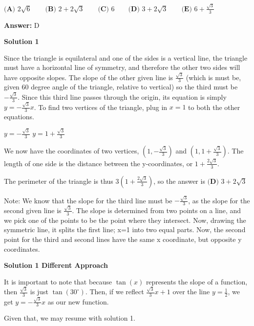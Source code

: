 \begin{enumerate}
 $\textbf{(A) }2\sqrt{6}\qquad\textbf{(B) }2+2\sqrt{3}\qquad\textbf{(C) }6\qquad\textbf{(D) }3+2\sqrt{3}\qquad\textbf{(E) }6+\frac{\sqrt{3}}{3}$

 \textbf{Answer: }D



\textbf{Solution 1}

Since the triangle is equilateral and one of the sides is a vertical line, the triangle must have a horizontal line of symmetry, and therefore the other two sides will have opposite slopes. The slope of the other given line is $\frac{\sqrt{3}}{3}$ (which is must be, given 60 degree angle of the triangle, relative to vertical) so the third must be $-\frac{\sqrt{3}}{3}$. Since this third line passes through the origin, its equation is simply $y = -\frac{\sqrt{3}}{3}x$. To find two vertices of the triangle, plug in $x=1$ to both the other equations. 

 $y = -\frac{\sqrt{3}}{3}$
$y = 1 + \frac{\sqrt{3}}{3}$

 We now have the coordinates of two vertices, $\left(1, -\frac{\sqrt{3}}{3}\right)$ and $\left(1, 1 + \frac{\sqrt{3}}{3}\right)$. The length of one side is the distance between the y-coordinates, or $1 +  \frac{2\sqrt{3}}{3}$.

 The perimeter of the triangle is thus $3\left(1 +  \frac{2\sqrt{3}}{3}\right)$, so the answer is $\boxed{\textbf{(D) }3 + 2\sqrt{3}}$

 Note: We know that the slope for the third line must be $-\frac{\sqrt{3}}{3}$, as the slope for the second given line is $\frac{\sqrt{3}}{3}$. The slope is determined from two points on a line, and we pick one of the points to be the point where they intersect. Now, drawing the symmetric line, it splits the first line; x=1 into two equal parts. Now, the second point for the third and second lines have the same x coordinate, but opposite y coordinates.

 



\textbf{Solution 1 Different Approach}

It is important to note that because \( \tan(x) \) represents the slope of a function, then \( \frac{\sqrt{3}}{3} \) is just \( \tan(30^\circ) \). Then, if we reflect \( \frac{\sqrt{3}}{3} x+1 \) over the line \( y=\frac{1}{2} \), we get \( y=-\frac{\sqrt{3}}{3}x \) as our new function.

 Given that, we may resume with solution 1.

 




\end{enumerate}
